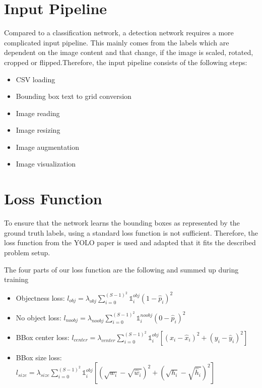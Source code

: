 \documentclass[landscape,a2,final,12pt]{issposter}
\begin{document}
\begin{multicols}{3}
\section{Input Pipeline}
        \begin{small}Compared to a classification network, a detection network requires a more complicated input pipeline. This mainly comes from the 
        labels which are dependent on the image content and that change, if the image is scaled, rotated, cropped or flipped.Therefore, the input pipeline consists of the following steps:
        \begin{itemize}
            \item CSV loading
            \item Bounding box text to grid conversion
            \item Image reading
            \item Image resizing
            \item Image augmentation
            \item Image visualization
        \end{itemize}
        \end{small}
       
    \columnbreak
    \section{Loss Function}
        \begin{small} To ensure that the network learns the bounding boxes as represented by the ground truth labels, 
        using a standard loss function is not sufficient. Therefore, the loss function from the YOLO paper is used and adapted 
        that it fits the described problem setup.
        
        
        The four parts of our loss function are the following and summed up during training 
        \begin{itemize}
            \item Objectness loss: \quad $l_{obj} = \lambda_{obj} \sum_{i=0}^{(S-1)^2} \mathds{1}_{i}^{obj} (1 - \hat{p}_i)^2  $
            \item No object loss: \quad \quad $l_{noobj} = \lambda_{noobj} \sum_{i=0}^{(S-1)^2} \mathds{1}_{i}^{noobj} (0 - \hat{p}_i)^2  $
            \item BBox center loss: \quad $l_{center} = \lambda_{center} \sum_{i=0}^{(S-1)^2} \mathds{1}_{i}^{obj} [(x_i - \hat{x}_i)^2 + (y_i - \hat{y}_i)^2] $
            \item BBox size loss: \quad \quad$l_{size} = \lambda_{size} \sum_{i=0}^{(S-1)^2} \mathds{1}_{i}^{obj} [(\sqrt{w_i} - \sqrt{\hat{w}_i})^2 + (\sqrt{h_i} - \sqrt{\hat{h}_i})^2] $
        \end{itemize}


\end{small}
\end{multicols}
\end{document}
